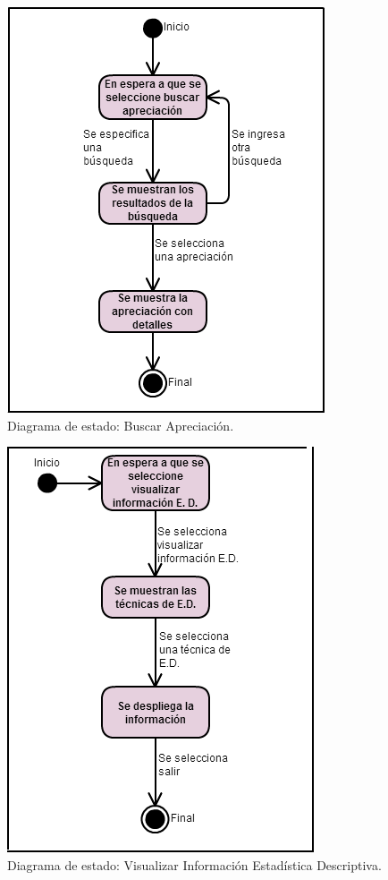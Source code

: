 \begin{figure}[htb]
	\label{dde6}
	\begin{center}
		\includegraphics[scale=0.5]{imagenes/BuscarNCFAS.png}
	\end{center}
	\caption{Diagrama de estado: Buscar Apreciación.}
\end{figure}


\begin{figure}[htb]
	\label{dde7}
	\begin{center}
		\includegraphics[scale=0.6]{imagenes/VisualizarInfoED.png}
	\end{center}
	\caption{Diagrama de estado: Visualizar Información Estadística Descriptiva.}
\end{figure}


